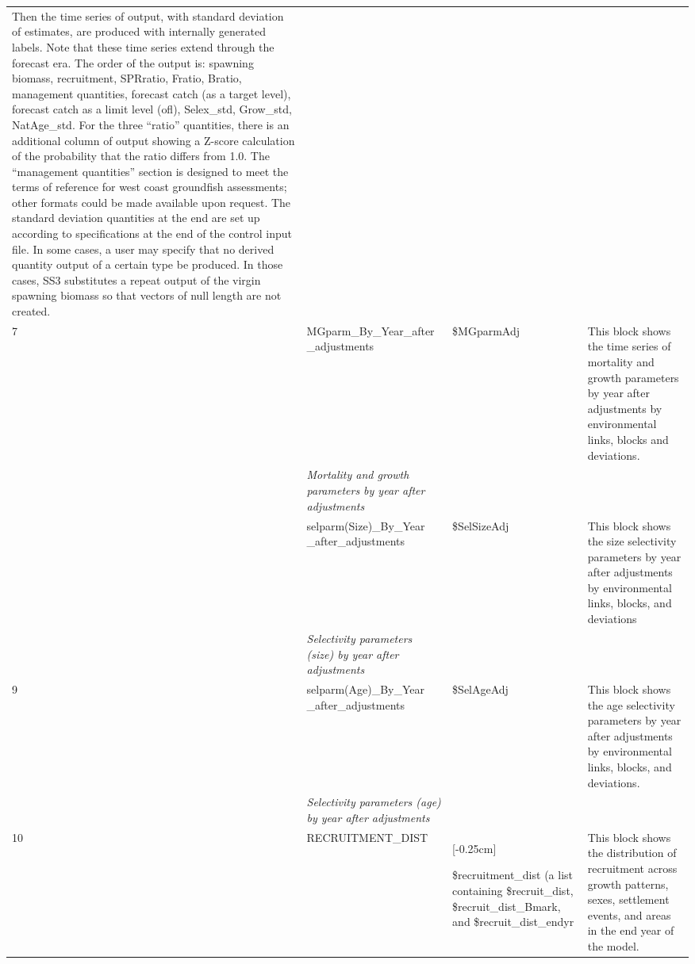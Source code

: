 \begin{landscape}
\begin{longtable}{p{1.5cm} p{5.5cm} >{\RaggedRight\arraybackslash}p{4.25cm} p{9.75cm}}
    Then the time series of output, with standard deviation of estimates, are produced with internally generated labels. Note that these time series extend through the forecast era. The order of the output is: spawning biomass, recruitment, SPRratio, Fratio, Bratio, management quantities, forecast catch (as a target level), forecast catch as a limit level (\gls{ofl}), Selex\_std, Grow\_std, NatAge\_std. For the three “ratio” quantities, there is an additional column of output showing a Z-score calculation of the probability that the ratio differs from 1.0. The “management quantities” section is designed to meet the terms of reference for west coast groundfish assessments; other formats could be made available upon request. The standard deviation quantities at the end are set up according to specifications at the end of the control input file. In some cases, a user may specify that no derived quantity output of a certain type be produced. In those cases, SS3 substitutes a repeat output of the virgin spawning biomass so that vectors of null length are not created. \Bstrut\\
    7 & MGparm\_By\_Year\_after \_adjustments & \$MGparmAdj & \multirow{1}{1cm}[-0.25cm]{\parbox{9.5cm}{This block shows the time series of mortality and growth parameters by year after adjustments by environmental links, blocks and deviations.}} \\
      & \textit{Mortality and growth parameters by year after adjustments} & & \Bstrut\\
    \pagebreak
    8 & selparm(Size)\_By\_Year \_after\_adjustments & \$SelSizeAdj & \multirow{1}{1cm}[-0.25cm]{\parbox{9.5cm}{This block shows the size selectivity parameters by year after adjustments by environmental links, blocks, and deviations}} \\
      & \textit{Selectivity parameters (size) by year after adjustments} & & \Bstrut\\
    9 & selparm(Age)\_By\_Year \_after\_adjustments & \$SelAgeAdj & \multirow{1}{1cm}[-0.25cm]{\parbox{9.5cm}{This block shows the age selectivity parameters by year after adjustments by environmental links, blocks, and deviations.}} \\
      & \textit{Selectivity parameters (age) by year after adjustments} & & \Bstrut\\
    10 & RECRUITMENT\_DIST & \multirow{1}{1cm}[-0.25cm]{\parbox{4cm}{\$recruitment\_dist (a list containing \$recruit\_dist, \$recruit\_dist\_Bmark, and \$recruit\_dist\_endyr}} & \multirow{1}{1cm}[-0.25cm]{\parbox{9.5cm}{This block shows the distribution of recruitment across growth patterns, sexes, settlement events, and areas in the end year of the model.}} \\

\end{longtable}
\end{landscape}
